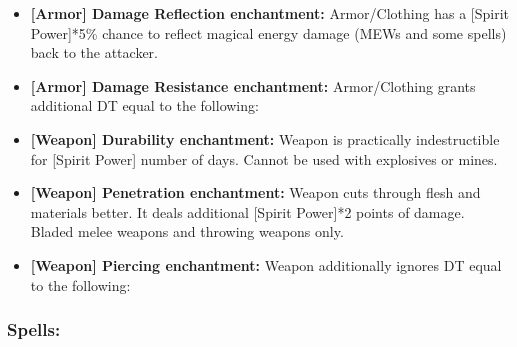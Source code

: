 \documentclass[11pt,a4paper,twocolumn]{book}
\begin{document}
\begin{itemize}
\item \textbf{ [Armor] Damage Reflection enchantment:} 
Armor/Clothing has a [Spirit Power]*5\% chance to reflect magical energy damage (MEWs and some spells) back to the attacker.

\item \textbf{ [Armor] Damage Resistance enchantment:} Armor/Clothing grants additional DT equal to the following:

\item \textbf{ [Weapon] Durability enchantment:} Weapon is practically indestructible for [Spirit Power] number of days. Cannot be used with explosives or mines.
 
\item \textbf{ [Weapon] Penetration enchantment:} Weapon cuts through flesh and materials better. It deals additional [Spirit Power]*2 points of damage. Bladed melee weapons and throwing weapons only.

\item \textbf{ [Weapon] Piercing enchantment:} Weapon additionally ignores DT equal to the following:

\end{itemize}

\subsubsection*{Spells:}

\end{document}

